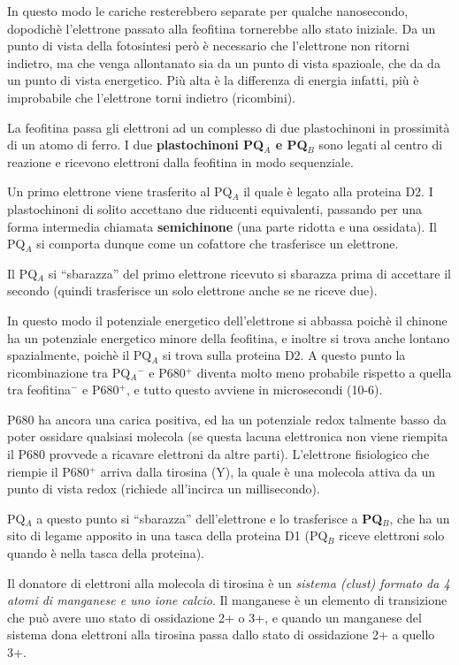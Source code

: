 \documentclass[]{article}
\begin{document}
In questo modo le cariche resterebbero separate per qualche nanosecondo,
dopodichè l'elettrone passato alla feofitina tornerebbe allo stato
iniziale. Da un punto di vista della fotosintesi però è necessario che
l'elettrone non ritorni indietro, ma che venga allontanato sia da un
punto di vista spazioale, che da da un punto di vista energetico. Più
alta è la differenza di energia infatti, più è improbabile che
l'elettrone torni indietro (ricombini).

La feofitina passa gli elettroni ad un complesso di due plastochinoni in
prossimità di un atomo di ferro. I due \textbf{plastochinoni PQ$_A$ e
PQ$_B$} sono legati al centro di reazione e ricevono elettroni dalla
feofitina in modo sequenziale.

Un primo elettrone viene trasferito al PQ$_A$ il quale è legato alla
proteina D2. I plastochinoni di solito accettano due riducenti
equivalenti, passando per una forma intermedia chiamata
\textbf{semichinone} (una parte ridotta e una ossidata). Il PQ$_A$ si
comporta dunque come un cofattore che trasferisce un elettrone.

Il PQ$_A$ si ``sbarazza'' del primo elettrone ricevuto si sbarazza prima
di accettare il secondo (quindi trasferisce un solo elettrone anche se
ne riceve due).

In questo modo il potenziale energetico dell'elettrone si abbassa poichè
il chinone ha un potenziale energetico minore della feofitina, e inoltre
si trova anche lontano spazialmente, poichè il PQ$_A$ si trova sulla
proteina D2. A questo punto la ricombinazione tra PQ$_A$$^-$ e P680$^+$
diventa molto meno probabile rispetto a quella tra feofitina$^-$ e
P680$^+$, e tutto questo avviene in microsecondi (10-6).

P680 ha ancora una carica positiva, ed ha un potenziale redox talmente
basso da poter ossidare qualsiasi molecola (se questa lacuna elettronica
non viene riempita il P680 provvede a ricavare elettroni da altre
parti). L'elettrone fisiologico che riempie il P680$^+$ arriva dalla
tirosina (Y), la quale è una molecola attiva da un punto di vista redox
(richiede all'incirca un millisecondo).

PQ$_A$ a questo punto si ``sbarazza'' dell'elettrone e lo trasferisce a
\textbf{PQ$_B$}, che ha un sito di legame apposito in una tasca della
proteina D1 (PQ$_B$ riceve elettroni solo quando è nella tasca della
proteina).

Il donatore di elettroni alla molecola di tirosina è un \emph{sistema
(clust) formato da 4 atomi di manganese e uno ione calcio}. Il manganese
è un elemento di transizione che può avere uno stato di ossidazione 2+ o
3+, e quando un manganese del sistema dona elettroni alla tirosina passa
dallo stato di ossidazione 2+ a quello 3+.
\end{document}
